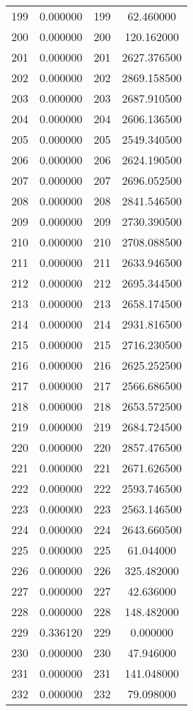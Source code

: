 \documentclass[12pt]{article}
\begin{document}
\begin{longtable}{@{}cccc@{}}
199 & 0.000000 & 199 & 62.460000 \\
200 & 0.000000 & 200 & 120.162000 \\
201 & 0.000000 & 201 & 2627.376500 \\
202 & 0.000000 & 202 & 2869.158500 \\
203 & 0.000000 & 203 & 2687.910500 \\
204 & 0.000000 & 204 & 2606.136500 \\
205 & 0.000000 & 205 & 2549.340500 \\
206 & 0.000000 & 206 & 2624.190500 \\
207 & 0.000000 & 207 & 2696.052500 \\
208 & 0.000000 & 208 & 2841.546500 \\
209 & 0.000000 & 209 & 2730.390500 \\
210 & 0.000000 & 210 & 2708.088500 \\
211 & 0.000000 & 211 & 2633.946500 \\
212 & 0.000000 & 212 & 2695.344500 \\
213 & 0.000000 & 213 & 2658.174500 \\
214 & 0.000000 & 214 & 2931.816500 \\
215 & 0.000000 & 215 & 2716.230500 \\
216 & 0.000000 & 216 & 2625.252500 \\
217 & 0.000000 & 217 & 2566.686500 \\
218 & 0.000000 & 218 & 2653.572500 \\
219 & 0.000000 & 219 & 2684.724500 \\
220 & 0.000000 & 220 & 2857.476500 \\
221 & 0.000000 & 221 & 2671.626500 \\
222 & 0.000000 & 222 & 2593.746500 \\
223 & 0.000000 & 223 & 2563.146500 \\
224 & 0.000000 & 224 & 2643.660500 \\
225 & 0.000000 & 225 & 61.044000 \\
226 & 0.000000 & 226 & 325.482000 \\
227 & 0.000000 & 227 & 42.636000 \\
228 & 0.000000 & 228 & 148.482000 \\
229 & 0.336120 & 229 & 0.000000 \\
230 & 0.000000 & 230 & 47.946000 \\
231 & 0.000000 & 231 & 141.048000 \\
232 & 0.000000 & 232 & 79.098000 \\

\end{longtable}
\end{document}
